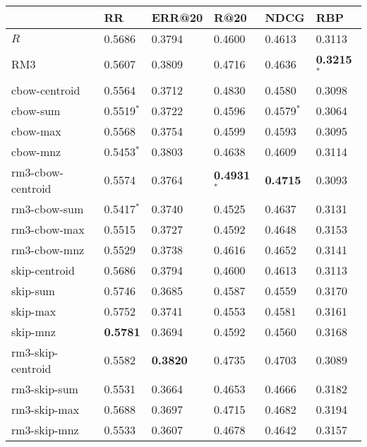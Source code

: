 \begin{tabular}{llllll}
\toprule
{} &               RR &           ERR@20 &                   R@20 &             NDCG &                    RBP \\
\midrule
$R$               &           0.5686 &           0.3794 &                   0.4600 &           0.4613 &                 0.3113 \\
RM3               &           0.5607 &           0.3809 &                 0.4716 &           0.4636 &  \textbf{0.3215}$^{*}$ \\
cbow-centroid     &           0.5564 &           0.3712 &                 0.4830 &           0.4580 &                 0.3098 \\
cbow-sum          &     0.5519$^{*}$ &           0.3722 &                 0.4596 &     0.4579$^{*}$ &                 0.3064 \\
cbow-max          &           0.5568 &           0.3754 &                 0.4599 &           0.4593 &                 0.3095 \\
cbow-mnz          &     0.5453$^{*}$ &           0.3803 &                 0.4638 &           0.4609 &                 0.3114 \\
rm3-cbow-centroid &           0.5574 &           0.3764 &  \textbf{0.4931}$^{*}$ &  \textbf{0.4715} &                 0.3093 \\
rm3-cbow-sum      &     0.5417$^{*}$ &           0.3740 &                 0.4525 &           0.4637 &                 0.3131 \\
rm3-cbow-max      &           0.5515 &           0.3727 &                 0.4592 &           0.4648 &                 0.3153 \\
rm3-cbow-mnz      &           0.5529 &           0.3738 &                 0.4616 &           0.4652 &                 0.3141 \\
skip-centroid     &           0.5686 &           0.3794 &                 0.4600 &           0.4613 &                 0.3113 \\
skip-sum          &           0.5746 &           0.3685 &                 0.4587 &           0.4559 &                 0.3170 \\
skip-max          &           0.5752 &           0.3741 &                 0.4553 &           0.4581 &                 0.3161 \\
skip-mnz          &  \textbf{0.5781} &           0.3694 &                 0.4592 &           0.4560 &                 0.3168 \\
rm3-skip-centroid &           0.5582 &  \textbf{0.3820} &                 0.4735 &           0.4703 &                 0.3089 \\
rm3-skip-sum      &           0.5531 &           0.3664 &                 0.4653 &           0.4666 &                 0.3182 \\
rm3-skip-max      &           0.5688 &           0.3697 &                 0.4715 &           0.4682 &                 0.3194 \\
rm3-skip-mnz      &           0.5533 &           0.3607 &                 0.4678 &           0.4642 &                 0.3157 \\
\bottomrule
\end{tabular}
